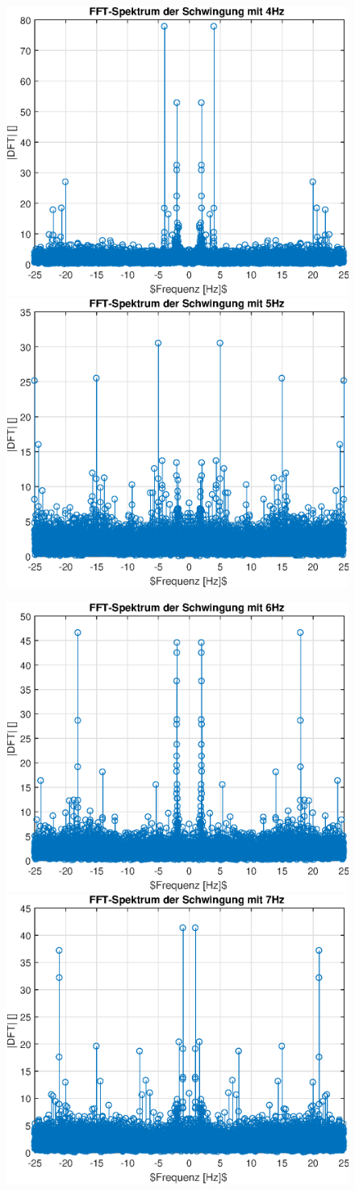 \documentclass{article}
\begin{document}
\begin{figure}[h!]
\includegraphics[width=0.5\linewidth]{img/dft_sinefreq_4}
\includegraphics[width=0.5\linewidth]{img/dft_sinefreq_5}
\end{figure}
\newpage
\begin{figure}[h!]
\includegraphics[width=0.5\linewidth]{img/dft_sinefreq_6}
\includegraphics[width=0.5\linewidth]{img/dft_sinefreq_7}
\end{figure}
\end{document}
